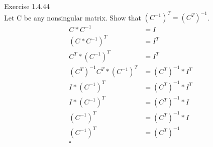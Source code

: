 \documentclass{article}
\begin{document}
	Exercise 1.4.44\\
	Let C be any nonsingular matrix. Show that $(C^{-1})^T = (C^T)^{-1}$. 
	\begin{align*}
		C*C^{-1}&=I\\	
		(C*C^{-1})^T&=I^T\\
		C^T*(C^{-1})^T&=I^T\\		
		(C^T)^{-1}C^T*(C^{-1})^T&=(C^T)^{-1}*I^T\\		
		I*(C^{-1})^T&=(C^T)^{-1}*I^T\\	
		I*(C^{-1})^T&=(C^T)^{-1}*I\\
		(C^{-1})^T&=(C^T)^{-1}*I\\		
		(C^{-1})^T&=(C^T)^{-1}\\		
		\square
	\end{align*}
\end{document}
